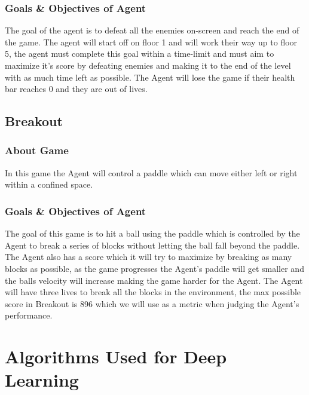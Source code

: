 \documentclass[conference]{IEEEtran}
\begin{document}
\subsubsection{Goals \& Objectives of Agent}
The goal of the agent is to defeat all the enemies on-screen and reach the end of the game.  The agent will start off on floor 1 and will work their way up to floor 5, the agent must complete this goal within a time-limit and must aim to maximize it's score by defeating enemies and making it to the end of the level with as much time left as possible.  The Agent will lose the game if their health bar reaches 0 and they are out of lives.
\subsection{Breakout}
\subsubsection{About Game}
In this game the Agent will control a paddle which can move either left or right within a confined space.
\subsubsection{Goals \& Objectives of Agent}
The goal of this game is to hit a ball using the paddle which is controlled by the Agent to break a series of blocks without letting the ball fall beyond the paddle.  The Agent also has a score which it will try to maximize by breaking as many blocks as possible, as the game progresses the Agent's paddle will get smaller and the balls velocity will increase making the game harder for the Agent.  The Agent will have three lives to break all the blocks in the environment, the max possible score in Breakout is 896 which we will use as a metric when judging the Agent's performance.
\section{Algorithms Used for Deep Learning}
\end{document}
